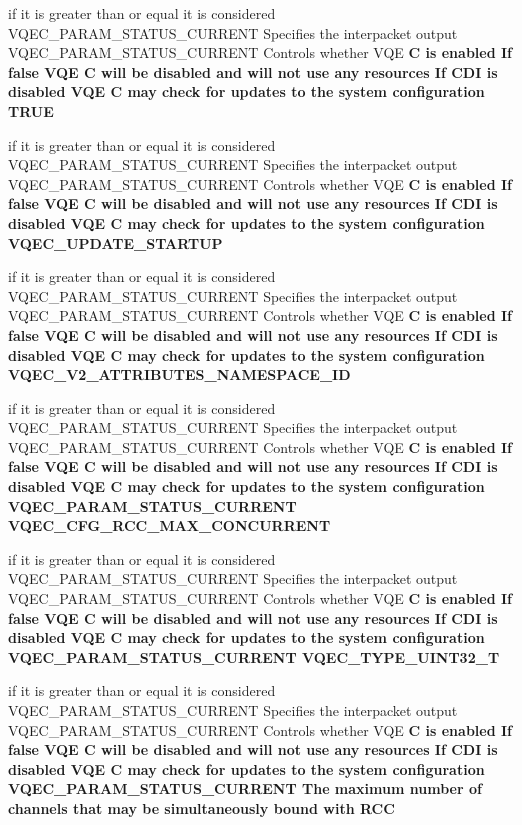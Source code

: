 \begin{CompactItemize}
\item 
if it is greater than or equal it is considered VQEC\_\-PARAM\_\-STATUS\_\-CURRENT Specifies the interpacket output VQEC\_\-PARAM\_\-STATUS\_\-CURRENT Controls whether VQE \bf{C} is enabled If false VQE \bf{C} will be disabled and will not use any resources If CDI is disabled VQE \bf{C} may check for updates \bf{to} the system configuration \bf{TRUE}
\item 
if it is greater than or equal it is considered VQEC\_\-PARAM\_\-STATUS\_\-CURRENT Specifies the interpacket output VQEC\_\-PARAM\_\-STATUS\_\-CURRENT Controls whether VQE \bf{C} is enabled If false VQE \bf{C} will be disabled and will not use any resources If CDI is disabled VQE \bf{C} may check for updates \bf{to} the system configuration \bf{VQEC\_\-UPDATE\_\-STARTUP}
\item 
if it is greater than or equal it is considered VQEC\_\-PARAM\_\-STATUS\_\-CURRENT Specifies the interpacket output VQEC\_\-PARAM\_\-STATUS\_\-CURRENT Controls whether VQE \bf{C} is enabled If false VQE \bf{C} will be disabled and will not use any resources If CDI is disabled VQE \bf{C} may check for updates \bf{to} the system configuration \bf{VQEC\_\-V2\_\-ATTRIBUTES\_\-NAMESPACE\_\-ID}
\item 
if it is greater than or equal it is considered VQEC\_\-PARAM\_\-STATUS\_\-CURRENT Specifies the interpacket output VQEC\_\-PARAM\_\-STATUS\_\-CURRENT Controls whether VQE \bf{C} is enabled If false VQE \bf{C} will be disabled and will not use any resources If CDI is disabled VQE \bf{C} may check for updates \bf{to} the system configuration VQEC\_\-PARAM\_\-STATUS\_\-CURRENT \bf{VQEC\_\-CFG\_\-RCC\_\-MAX\_\-CONCURRENT}
\item 
if it is greater than or equal it is considered VQEC\_\-PARAM\_\-STATUS\_\-CURRENT Specifies the interpacket output VQEC\_\-PARAM\_\-STATUS\_\-CURRENT Controls whether VQE \bf{C} is enabled If false VQE \bf{C} will be disabled and will not use any resources If CDI is disabled VQE \bf{C} may check for updates \bf{to} the system configuration VQEC\_\-PARAM\_\-STATUS\_\-CURRENT \bf{VQEC\_\-TYPE\_\-UINT32\_\-T}
\item 
if it is greater than or equal it is considered VQEC\_\-PARAM\_\-STATUS\_\-CURRENT Specifies the interpacket output VQEC\_\-PARAM\_\-STATUS\_\-CURRENT Controls whether VQE \bf{C} is enabled If false VQE \bf{C} will be disabled and will not use any resources If CDI is disabled VQE \bf{C} may check for updates \bf{to} the system configuration VQEC\_\-PARAM\_\-STATUS\_\-CURRENT The maximum number of \bf{channels} that may be simultaneously bound with \bf{RCC}

\end{CompactItemize}
